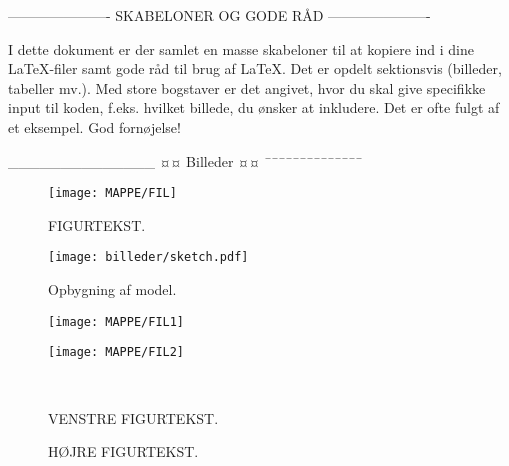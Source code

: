 
----------------------
SKABELONER OG GODE RÅD
----------------------

I dette dokument er der samlet en masse skabeloner til at kopiere ind i dine LaTeX-filer samt gode råd til brug af LaTeX. Det er opdelt sektionsvis (billeder, tabeller mv.). Med store bogstaver er det angivet, hvor du skal give specifikke input til koden, f.eks. hvilket billede, du ønsker at inkludere. Det er ofte fulgt af et eksempel. God fornøjelse!

______________
¤¤ Billeder ¤¤
¯¯¯¯¯¯¯¯¯¯¯¯¯¯

\begin{figure}[htbp] %
	\centering
	\texttt{[image: MAPPE/FIL]}
	\caption{FIGURTEKST.}
	\label{fig:LABEL}
\end{figure}

\begin{figure}[H]
	\centering
	\texttt{[image: billeder/sketch.pdf]}
	\caption{Opbygning af model.}
	\label{fig:sketch}
\end{figure}

\begin{figure}[H]
	\centering
	\begin{minipage}[b]{0.48\textwidth}
	\centering
	\texttt{[image: MAPPE/FIL1]} %
	\end{minipage}
	\hfill
	\begin{minipage}[b]{0.48\textwidth}
	\centering
	\texttt{[image: MAPPE/FIL2]} %
	\end{minipage}
	\\ %
	\begin{minipage}[t]{0.48\textwidth}
	\caption{VENSTRE FIGURTEKST.} %
	\label{fig:LABEL1}
	\end{minipage}
	\hfill
	\begin{minipage}[t]{0.48\textwidth}
	\caption{HØJRE FIGURTEKST.} %
	\label{fig:LABEL2}
	\end{minipage}
\end{figure}

